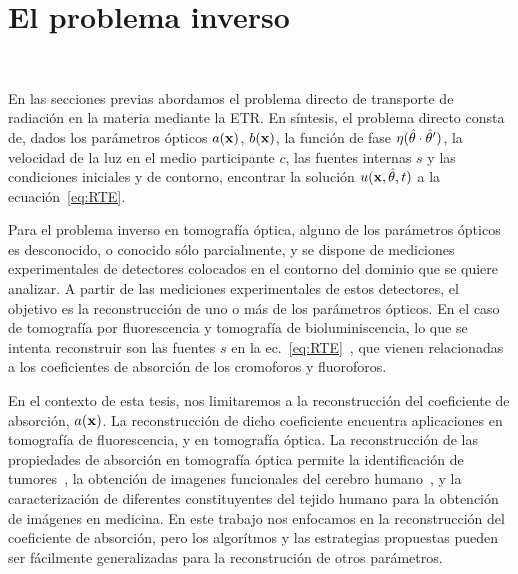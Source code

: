 \chapter{El problema inverso}%
\lhead{\thepage}
 \\
\vspace{0.01\textheight}
\label{sec:inverso}

En las secciones previas abordamos el problema directo de transporte 
de radiación en la materia mediante la ETR. En síntesis, el problema 
directo consta de, dados los parámetros ópticos $a(\mathbf{x})$, $b(\mathbf{x})$, la función  
de fase $\eta(\hat{\theta}\cdot \hat{\theta}')$, la velocidad de la luz en el medio participante 
$c$, las fuentes internas $s$ y las condiciones iniciales y de contorno, 
encontrar la solución $u(\mathbf{x},\hat{\theta},t)$ a la ecuación~\eqref{eq:RTE}.

Para el problema inverso en tomografía óptica, alguno de los parámetros 
ópticos es desconocido, 
o conocido sólo parcialmente, y se dispone de mediciones experimentales 
de detectores colocados en el contorno del dominio que se quiere analizar. 
A partir de las mediciones experimentales de estos detectores, 
el objetivo es la reconstrucción de uno o más de los parámetros ópticos. 
En el caso de tomografía por fluorescencia y tomografía de bioluminiscencia, lo que se intenta reconstruir 
son las fuentes $s$ en la ec.~\eqref{eq:RTE}~\cite{Klose2005,Klose2009,Ren2010}, 
que vienen relacionadas a los coeficientes de absorción de los 
cromoforos y fluoroforos. 

En el contexto de esta tesis, nos limitaremos a la reconstrucción del 
coeficiente de absorción, $a(\mathbf{x})$. La reconstrucción de dicho coeficiente 
encuentra aplicaciones en tomografía de fluorescencia, y en tomografía óptica. 
La reconstrucción de las propiedades de absorción en tomografía óptica 
 permite la identificación de tumores~\cite{Zhu2005,Zhu2010,Fujii2016b}, 
la obtención de imagenes funcionales del cerebro humano~\cite{Boas2001,bluestone2001,Arridge1999}, 
y la caracterización de diferentes constituyentes del tejido 
humano para la obtención de imágenes en medicina. En 
este trabajo nos enfocamos en la reconstrucción del coeficiente 
de absorción, pero los algorítmos y las estrategias propuestas 
pueden ser fácilmente generalizadas para la reconstrución 
de otros parámetros. 

